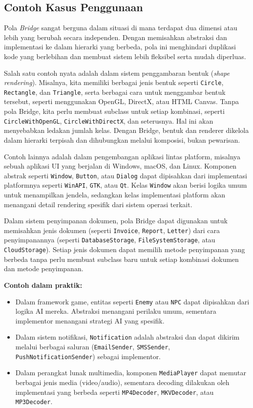\subsection{Contoh Kasus Penggunaan}

Pola \textit{Bridge} sangat berguna dalam situasi di mana terdapat dua dimensi atau lebih yang berubah secara independen. Dengan memisahkan abstraksi dan implementasi ke dalam hierarki yang berbeda, pola ini menghindari duplikasi kode yang berlebihan dan membuat sistem lebih fleksibel serta mudah diperluas.

Salah satu contoh nyata adalah dalam sistem penggambaran bentuk (\textit{shape rendering}). Misalnya, kita memiliki berbagai jenis bentuk seperti \texttt{Circle}, \texttt{Rectangle}, dan \texttt{Triangle}, serta berbagai cara untuk menggambar bentuk tersebut, seperti menggunakan OpenGL, DirectX, atau HTML Canvas. Tanpa pola Bridge, kita perlu membuat subclass untuk setiap kombinasi, seperti \texttt{CircleWithOpenGL}, \texttt{CircleWithDirectX}, dan seterusnya. Hal ini akan menyebabkan ledakan jumlah kelas. Dengan Bridge, bentuk dan renderer dikelola dalam hierarki terpisah dan dihubungkan melalui komposisi, bukan pewarisan.

Contoh lainnya adalah dalam pengembangan aplikasi lintas platform, misalnya sebuah aplikasi UI yang berjalan di Windows, macOS, dan Linux. Komponen abstrak seperti \texttt{Window}, \texttt{Button}, atau \texttt{Dialog} dapat dipisahkan dari implementasi platformnya seperti \texttt{WinAPI}, \texttt{GTK}, atau \texttt{Qt}. Kelas \texttt{Window} akan berisi logika umum untuk menampilkan jendela, sedangkan kelas implementasi platform akan menangani detail rendering spesifik dari sistem operasi terkait.

Dalam sistem penyimpanan dokumen, pola Bridge dapat digunakan untuk memisahkan jenis dokumen (seperti \texttt{Invoice}, \texttt{Report}, \texttt{Letter}) dari cara penyimpanannya (seperti \texttt{DatabaseStorage}, \texttt{FileSystemStorage}, atau \texttt{CloudStorage}). Setiap jenis dokumen dapat memilih metode penyimpanan yang berbeda tanpa perlu membuat subclass baru untuk setiap kombinasi dokumen dan metode penyimpanan.

\textbf{Contoh dalam praktik:}
\begin{itemize}
	\item Dalam framework game, entitas seperti \texttt{Enemy} atau \texttt{NPC} dapat dipisahkan dari logika AI mereka. Abstraksi menangani perilaku umum, sementara implementor menangani strategi AI yang spesifik.
	\item Dalam sistem notifikasi, \texttt{Notification} adalah abstraksi dan dapat dikirim melalui berbagai saluran (\texttt{EmailSender}, \texttt{SMSSender}, \texttt{PushNotificationSender}) sebagai implementor.
	\item Dalam perangkat lunak multimedia, komponen \texttt{MediaPlayer} dapat memutar berbagai jenis media (video/audio), sementara decoding dilakukan oleh implementasi yang berbeda seperti \texttt{MP4Decoder}, \texttt{MKVDecoder}, atau \texttt{MP3Decoder}.
\end{itemize}

